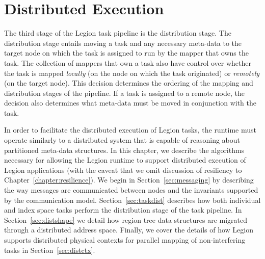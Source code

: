 

\chapter{Distributed Execution}
\label{chapter:distributed}
The third stage %
of the Legion task pipeline is the distribution stage.  
The distribution stage entails moving
a task and any necessary meta-data to the target node
on which the task is assigned to run by the mapper
that owns the task. The collection of mappers that own
a task also have control over whether the task is mapped 
{\em locally} (on the node on which the task originated) 
or {\em remotely} (on the target node).  This decision 
determines the ordering of the mapping and distribution 
stages  of the pipeline. If a task is assigned to a remote
node, the decision also determines what meta-data
must be moved in conjunction with the task.

In order to facilitate the distributed execution of
Legion tasks, the runtime must operate similarly to
a distributed system that is capable of reasoning 
about partitioned meta-data structures. In this
chapter, we describe the algorithms necessary for
allowing the Legion runtime to support distributed
execution of Legion applications (with the caveat
that we omit discussion of resiliency to
Chapter~\ref{chapter:resilience}).  We begin
in Section~\ref{sec:messaging} by describing 
the way messages are communicated between nodes
and the invariants supported by the communication
model. Section~\ref{sec:taskdist} describes how
both individual and index space tasks perform
the distribution stage of the task pipeline.
In Section~\ref{sec:distshape} we detail
how region tree data structures are migrated
through a distributed address space.  Finally,
we cover the details of how Legion supports
distributed physical contexts for parallel
mapping of non-interfering tasks in 
Section~\ref{sec:distctx}.

